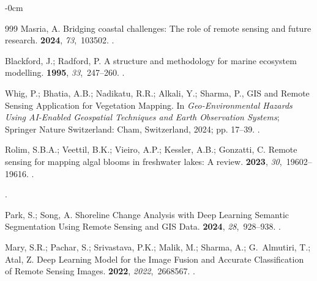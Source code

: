 \documentclass[jmse,article,accept,pdftex,oneauthor]{Definitions/mdpi}
\begin{document}
\begin{adjustwidth}{-\extralength}{0cm}
\begin{thebibliography}{999}
Masria, A.
\newblock Bridging coastal challenges: The role of remote sensing and future
  research.
 {\bf 2024}, {\em
  73},~103502.
.

Blackford, J.; Radford, P.
\newblock A structure and methodology for marine ecosystem modelling.
 {\bf 1995}, {\em
  33},~247--260.
.

Whig, P.; Bhatia, A.B.; Nadikatu, R.R.; Alkali, Y.; Sharma, P., GIS and Remote
  Sensing Application for Vegetation Mapping.
\newblock In {\em Geo-Environmental Hazards Using AI-Enabled Geospatial
  Techniques and Earth Observation Systems}; Springer Nature Switzerland: Cham, Switzerland,
   2024; pp. 17--39.
.

Rolim, S.B.A.; Veettil, B.K.; Vieiro, A.P.; Kessler, A.B.; Gonzatti, C.
\newblock Remote sensing for mapping algal blooms in freshwater lakes: A
  review.
 {\bf 2023}, {\em
  30},~19602--19616.
.

.

Park, S.; Song, A.
\newblock Shoreline Change Analysis with Deep Learning Semantic Segmentation
  Using Remote Sensing and GIS Data.
 {\bf 2024}, {\em
  28},~928--938.
.

Mary, S.R.; Pachar, S.; Srivastava, P.K.; Malik, M.; Sharma, A.; G.~Almutiri,
  T.; Atal, Z.
\newblock Deep Learning Model for the Image Fusion and Accurate Classification
  of Remote Sensing Images.
 {\bf 2022}, {\em
  2022},~2668567.
.


\end{thebibliography}
\end{adjustwidth}
\end{document}
